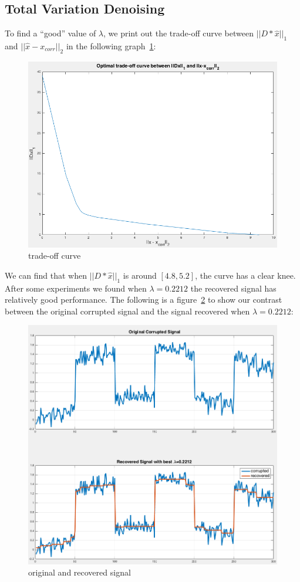 \message{ !name(ass5_ChangLi.tex)}\documentclass[10pt,a4paper]{article}
\begin{document}
\subsection{Total Variation Denoising}
To find a ``good'' value of $\lambda$, we print out the
trade-off curve between $||D*\hat{x}||_1$ and
$||\hat{x}-x_{corr}||_2$ in the following graph~\ref{fig:q3tradeoff}:

\begin{figure}[ht]
  \centering
  \includegraphics[width=0.7\linewidth]{Q3_tradeoff}
  \caption{trade-off curve}
  \label{fig:q3tradeoff}
\end{figure}

We can find that when $||D*\hat{x}||_1$ is around
$[4.8,5.2]$, the curve has a clear knee. After some
experiments we found when $\lambda = 0.2212$ the recovered
signal has relatively good performance. The following is a
figure~\ref{fig:q3recovered} to show our contrast between the original corrupted
signal and the signal recovered when $\lambda = 0.2212$:


\begin{figure}[ht]
  \centering
  \includegraphics[width=0.8\linewidth]{Q3_signal}
  \caption{original and recovered signal}
  \label{fig:q3recovered}
\end{figure}
\end{document}
